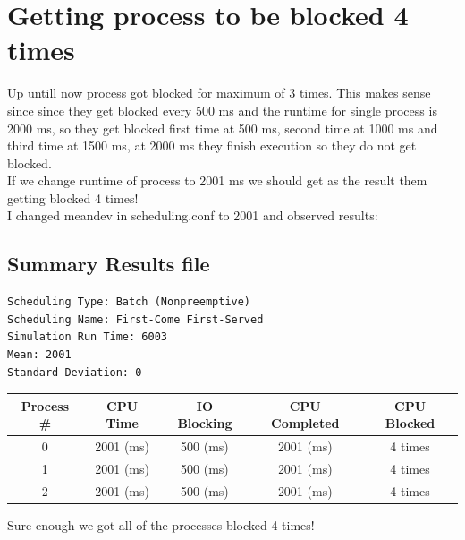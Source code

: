 \documentclass{article}
\begin{document}
\section{Getting process to be blocked 4 times}
Up untill now process got blocked for maximum of 3 times. This makes sense since
since they get blocked every 500 ms and the runtime for single process is 2000
ms, so they get blocked first time at 500 ms, second time at 1000 ms and third
time at 1500 ms, at 2000 ms they finish execution so they do not get blocked. \\
If we change runtime of process to 2001 ms we should get as the result them
getting blocked 4 times! \\
I changed meandev in scheduling.conf to 2001 and observed results:
\subsection{Summary Results file}
\begin{lstlisting}
Scheduling Type: Batch (Nonpreemptive)
Scheduling Name: First-Come First-Served
Simulation Run Time: 6003
Mean: 2001
Standard Deviation: 0
\end{lstlisting}
\begin{center}
	\begin{tabular}{| c | c | c | c | c |}
		\hline
		Process \#&	CPU Time&	IO Blocking&	CPU Completed&
		CPU Blocked \\ \hline
		0	&	2001 (ms)&	500 (ms)&	2001 (ms)&
		4 times  \\ \hline
		1	&	2001 (ms)&	500 (ms)&	2001 (ms)&
		4 times \\ \hline
		2	&	2001 (ms)&	500 (ms)&	2001 (ms)&
		4 times \\ \hline
\end{tabular}
\end{center}
Sure enough we got all of the processes blocked 4 times!
\end{document}

